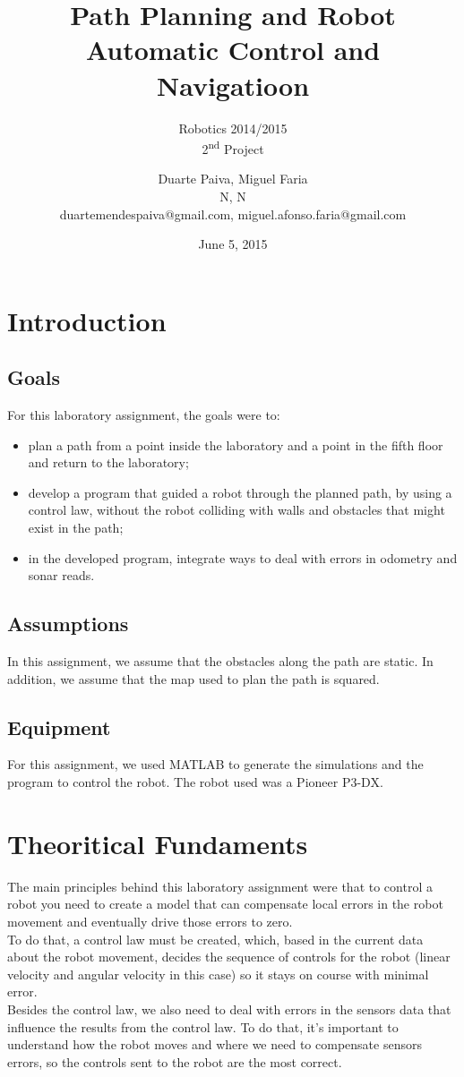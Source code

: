 \documentclass[11pt,a4paper]{scrartcl}
\title{Path Planning and Robot Automatic Control and Navigatioon}
\subtitle{Robotics 2014/2015 \\ 2\textsuperscript{nd} Project}
\author{Duarte Paiva, Miguel Faria\\
		N\degree70751, N\degree73092\\
        duartemendespaiva@gmail.com, miguel.afonso.faria@gmail.com}
\date{June 5, 2015}
\begin{document}
\maketitle
\newpage
\tableofcontents{}

\section{Introduction}

\subsection{Goals}
For this laboratory assignment, the goals were to:
\begin{itemize}
	\item plan a path from a point inside the laboratory and a point in the fifth floor and return to the laboratory;
    \item develop a program that guided a robot through the planned path, by using a control law, without the robot colliding with walls and obstacles that might exist in the path;
    \item in the developed program, integrate ways to deal with errors in odometry and sonar reads.
\end{itemize}

\subsection{Assumptions}
In this assignment, we assume that the obstacles along the path are static. In addition, we assume that the map used to plan the path is squared.

\subsection{Equipment}
For this assignment, we used MATLAB to generate the simulations and the program to control the robot. The robot used was a Pioneer P3-DX. %

\section{Theoritical Fundaments}
The main principles behind this laboratory assignment were that to control a robot you need to create a model that can compensate local errors in the robot movement and eventually drive those errors to zero.\\
To do that, a control law must be created, which, based in the current data about the robot movement, decides the sequence of controls for the robot (linear velocity and angular velocity in this case) so it stays on course with minimal error.\\
Besides the control law, we also need to deal with errors in the sensors data that influence the results from the control law. To do that, it's important to understand how the robot moves and where we need to compensate sensors  errors, so the controls sent to the robot are the most correct.
\end{document}
